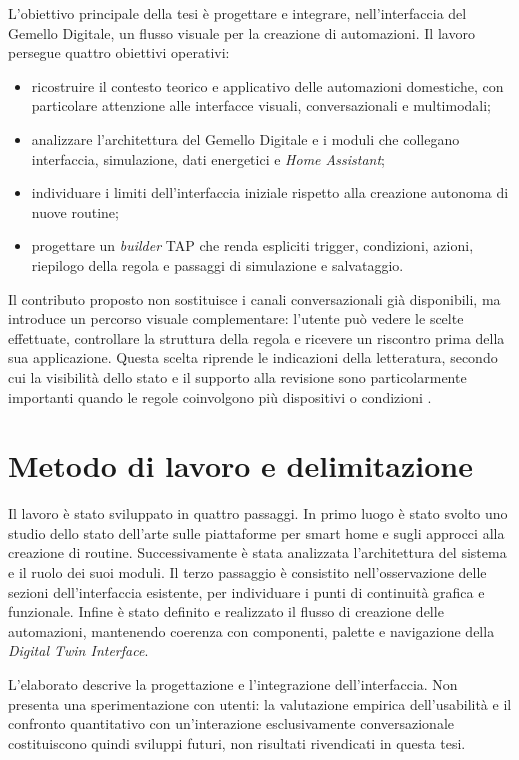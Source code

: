 L'obiettivo principale della tesi \`e progettare e integrare, nell'interfaccia del Gemello Digitale, un flusso visuale per la creazione di automazioni. Il lavoro persegue quattro obiettivi operativi:
\begin{itemize}
    \item ricostruire il contesto teorico e applicativo delle automazioni domestiche, con particolare attenzione alle interfacce visuali, conversazionali e multimodali;
    \item analizzare l'architettura del Gemello Digitale e i moduli che collegano interfaccia, simulazione, dati energetici e \textit{Home Assistant};
    \item individuare i limiti dell'interfaccia iniziale rispetto alla creazione autonoma di nuove routine;
    \item progettare un \textit{builder} TAP che renda espliciti trigger, condizioni, azioni, riepilogo della regola e passaggi di simulazione e salvataggio.
\end{itemize}

Il contributo proposto non sostituisce i canali conversazionali gi\`a disponibili, ma introduce un percorso visuale complementare: l'utente pu\`o vedere le scelte effettuate, controllare la struttura della regola e ricevere un riscontro prima della sua applicazione. Questa scelta riprende le indicazioni della letteratura, secondo cui la visibilit\`a dello stato e il supporto alla revisione sono particolarmente importanti quando le regole coinvolgono pi\`u dispositivi o condizioni \cite{Barricelli2022MultiModal,Lago2021}.

\section{Metodo di lavoro e delimitazione}
Il lavoro \`e stato sviluppato in quattro passaggi. In primo luogo \`e stato svolto uno studio dello stato dell'arte sulle piattaforme per smart home e sugli approcci alla creazione di routine. Successivamente \`e stata analizzata l'architettura del sistema e il ruolo dei suoi moduli. Il terzo passaggio \`e consistito nell'osservazione delle sezioni dell'interfaccia esistente, per individuare i punti di continuit\`a grafica e funzionale. Infine \`e stato definito e realizzato il flusso di creazione delle automazioni, mantenendo coerenza con componenti, palette e navigazione della \textit{Digital Twin Interface}.

L'elaborato descrive la progettazione e l'integrazione dell'interfaccia. Non presenta una sperimentazione con utenti: la valutazione empirica dell'usabilit\`a e il confronto quantitativo con un'interazione esclusivamente conversazionale costituiscono quindi sviluppi futuri, non risultati rivendicati in questa tesi.

